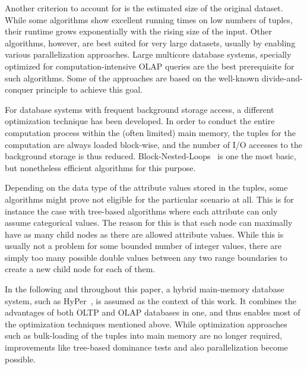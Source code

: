Another criterion to account for is the estimated size of the original dataset. While some algorithms show excellent running times on low numbers of tuples, their runtime grows exponentially with the rising size of the input. Other algorithms, however, are best suited for very large datasets, usually by enabling various parallelization approaches. Large multicore database systems, specially optimized for computation-intensive OLAP queries are the best prerequisite for such algorithms. Some of the approaches are based on the well-known divide-and-conquer principle to achieve this goal. 

For database systems with frequent background storage access, a different optimization technique has been developed. In order to conduct the entire computation process within the (often limited) main memory, the tuples for the computation are always loaded block-wise, and the number of I/O accesses to the background storage is thus reduced. Block-Nested-Loops~\cite{kossmann} is one the most basic, but nonetheless efficient algorithms for this purpose. 

Depending on the data type of the attribute values stored in the tuples, some algorithms might prove not eligible for the particular scenario at all. This is for instance the case with tree-based algorithms where each attribute can only assume categorical values. The reason for this is that each node can maximally have as many child nodes as there are allowed attribute values. While this is usually not a problem for some bounded number of integer values, there are simply too many possible double values between any two range boundaries to create a new child node for each of them. 


In the following and throughout this paper, a hybrid main-memory database system, such as HyPer~\cite{hyper}, is assumed as the context of this work. It combines the advantages of both OLTP and OLAP databases in one, and thus enables most of the optimization techniques mentioned above. While optimization approaches such as bulk-loading of the tuples into main memory are no longer required, improvements like tree-based dominance tests and also parallelization become possible. 

